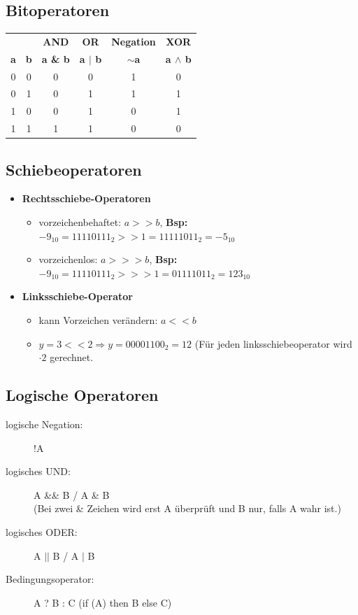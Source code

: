 \documentclass[a4paper,10pt]{article}
\newcommand{\Bold}[1]{\textbf{#1}} %
\newcommand{\Ra}{\Rightarrow}
\begin{document}
\subsection{Bitoperatoren}
\begin{tabular}{|c|c|c|c|c|c|}
	\hline
	& & \Bold {AND} & \Bold {OR} & \Bold {Negation} & \Bold {XOR} \\
	\Bold {a} & \Bold {b} & \Bold {a \& b} & \Bold {a $|$ b} & \Bold {$\sim$a} & \Bold {a $\wedge$  b} \\
	\hline
	0 & 0 & 0 & 0 & 1 & 0 \\
	0 & 1 & 0 & 1 & 1 & 1 \\
	1 & 0 & 0 & 1 & 0 & 1 \\
	1 & 1 & 1 & 1 & 0 & 0 \\
	\hline
\end{tabular}

\subsection{Schiebeoperatoren}
\begin{itemize}
	\item \Bold {Rechtsschiebe-Operatoren}
		\begin{itemize}
			\item vorzeichenbehaftet: $a >> b$, \Bold{Bsp:}$-9_{10} = 11110111_2 >> 1 = 11111011_2 = -5_{10}$
			\item vorzeichenlos: $a >>> b$, \Bold{Bsp:}$-9_{10} =  11110111_2 >>> 1 = 01111011_2 = 123_{10}$ 
		\end{itemize}
	\item \Bold {Linksschiebe-Operator}
		\begin{itemize}
			\item kann Vorzeichen ver\"andern:  $a << b$
			\item $y=3<<2\Ra y=00001100_2=12$ (F\"ur jeden linksschiebeoperator wird $\cdot 2$ gerechnet.
		\end{itemize}
\end{itemize}

\subsection{Logische Operatoren}
\begin{description}
	\item[logische Negation:] !A
	\item[logisches UND:] A \&\& B  / A \& B \\
				(Bei zwei \& Zeichen wird erst A \"uberpr\"uft und B nur, falls A wahr ist.)
	\item[logisches ODER:] A $||$ B / A $|$ B
	\item[Bedingungsoperator:] A ? B : C (if (A) then B else C)
\end{description}
\end{document}
